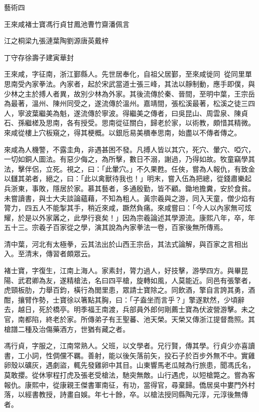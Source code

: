 
\begin{pinyinscope}
藝術四

王來咸褚士寶馮行貞甘鳳池曹竹齋潘佩言

江之桐梁九張漣葉陶劉源唐英戴梓

丁守存徐壽子建寅華封

王來咸，字征南，浙江鄞縣人。先世居奉化，自祖父居鄞，至來咸徙同，從同里單思南受內家拳法。內家者，起於宋武當道士張三峰，其法以靜制動，應手即僕，與少林之主於搏人者異，故別少林為外家。其後流傳於秦、晉間，至明中葉，王宗岳為最著，溫州、陳州同受之，遂流傳於溫州。嘉靖間，張松溪最著，松溪之徒三四人，寧波葉繼美為魁，遂流傳於寧波。得繼美之傳者，曰吳昆山、周雲泉、陳貞石、孫繼槎及思南，各有授受。思南從征關白，歸老於家，以術教，頗惜其精微。來咸從樓上穴板窺之，得其梗概。以銀卮易美檟奉思南，始盡以不傳者傳之。

來咸為人機警，不露圭角，非遇甚困不發。凡搏人皆以其穴，死穴、暈穴、啞穴，一切如銅人圖法。有惡少侮之，為所擊，數日不溺，謝過，乃得如故。牧童竊學其法，擊伴侶，立死。視之，曰：「此暈穴。」不久果甦。任俠，嘗為人報仇，有致金以讎其弟者，絕之，曰：「此以禽獸待我也！」明末，嘗入伍為把總，從錢肅樂起兵浙東，事敗，隱居於家。慕其藝者，多通殷勤，皆不顧。鋤地擔糞，安於食貧。未嘗讀書，與士大夫談論蘊藉，不知為粗人。黃宗羲與之游，同入天童，僧少焰有膂力，四五人不能掣其手，稍近來咸，蹶然負痛。來咸嘗曰：「今人以內家無可炫耀，於是以外家羼之，此學行衰矣！」因為宗羲論述其學源流。康熙八年，卒，年五十三。宗羲子百家從之學，演其說為內家拳法一卷，百家後無所傳焉。

清中葉，河北有太極拳，云其法出於山西王宗岳，其法式論解，與百家之言相出入。至清末，傳習者頗眾云。

褚士寶，字復生，江南上海人。家素封，膂力過人，好技擊，游學四方。與畢昆陽、武君卿為友，遂精槍法，名曰四平槍，旋轉如風，人莫能近。同邑有張擎者，虎頸板肋，力舉百鈞，橫行為閭里患，眾請士寶除之。同飲酒，擎自言誇其勇，酒酣，攘臂作勢，士寶徐以箸點其胸，曰：「子盍坐而言乎？」擎遂默然，少頃辭去，越日，死於橋亭。明季福王南渡，兵部員外郎何剛薦士寶為伏波營游擊。未之官，南都陷，終老於家。所傳弟子有王聖蕃、池天榮。天榮又傳浙江提督喬照。其槍譜二種及治傷藥酒方，世猶有藏之者。

馮行貞，字服之，江南常熟人。父班，以文學者。兄行賢，傳其學。行貞少亦喜讀書，工小詞，性倜儻不羈。善射，能以後矢落前矢，投石子於百步外無不中。實雞卵殼以礦灰，遇劇盜，輒先發雞卵中其目。山東響馬老瓜賊為行旅患，聞馮氏名，莫敢攖。從休寧程打虎及張老受槍法，馳突無敵。山行遇虎，以短槍斃之。嘗為客報仇。康熙中，從康親王傑書軍南征，有功，當得官，尋棄歸。僑居吳中婁門外村落，以經書教授，詩畫自娛。年七十餘，卒。以槍法授同縣陶元淳，元淳後無傳者。


\end{pinyinscope}
